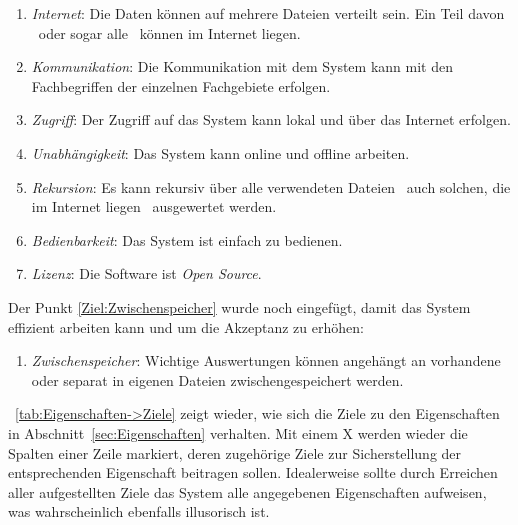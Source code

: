 \documentclass[english,ngerman,parskip=half,headsepline,footsepline]{scrreprt}
\newcounter{Enumi}
\newcommand*{\sectionname}{Abschnitt}
\begin{document}
{\begin{enumerate}
			\item \label{Ziel:Internet} \emph{Internet}: Die Daten können auf mehrere Dateien verteilt sein. Ein Teil davon \textendash\ oder sogar alle \textendash\ können im Internet liegen.

			\item \label{Ziel:Kommunikation} \emph{Kommunikation}: Die Kommunikation mit dem System kann mit den Fachbegriffen der einzelnen Fachgebiete erfolgen.

			\item \label{Ziel:Zugriff} \emph{Zugriff}: Der Zugriff auf das System kann lokal und über das Internet erfolgen.

			\item \label{Ziel:Unabhängigkeit} \emph{Unabhängigkeit}: Das System kann online und offline arbeiten.

			\item \label{Ziel:Rekursion} \emph{Rekursion}: Es kann rekursiv über alle verwendeten Dateien \textendash\ auch solchen, die im Internet liegen \textendash\ ausgewertet werden.

			\item \label{Ziel:Bedienbarkeit} \emph{Bedienbarkeit}: Das System ist einfach zu bedienen.

			\item \label{Ziel:Lizenz} \emph{Lizenz}: Die Software ist \emph{Open Source}.

			\setcounter{Enumi}{\value{enumi}}%
		\end{enumerate}

		Der Punkt \ref{Ziel:Zwischenspeicher} wurde noch eingefügt, damit das System effizient arbeiten kann und um die Akzeptanz zu erhöhen:

		\begin{enumerate}
			\setcounter{enumi}{\value{Enumi}}

			\item \label{Ziel:Zwischenspeicher} \emph{Zwischenspeicher}: Wichtige Auswertungen können angehängt an vorhandene oder separat in eigenen Dateien zwischengespeichert werden.

		\end{enumerate}

		\tablename~\vref{tab:Eigenschaften->Ziele} zeigt wieder, wie sich die Ziele zu den Eigenschaften in \sectionname~\vref{sec:Eigenschaften} verhalten. Mit einem X werden wieder die Spalten einer Zeile markiert, deren zugehörige Ziele zur Sicherstellung der entsprechenden Eigenschaft beitragen sollen. Idealerweise sollte durch Erreichen aller aufgestellten Ziele das System alle angegebenen Eigenschaften aufweisen, was wahrscheinlich ebenfalls illusorisch ist.

}
\end{document}
